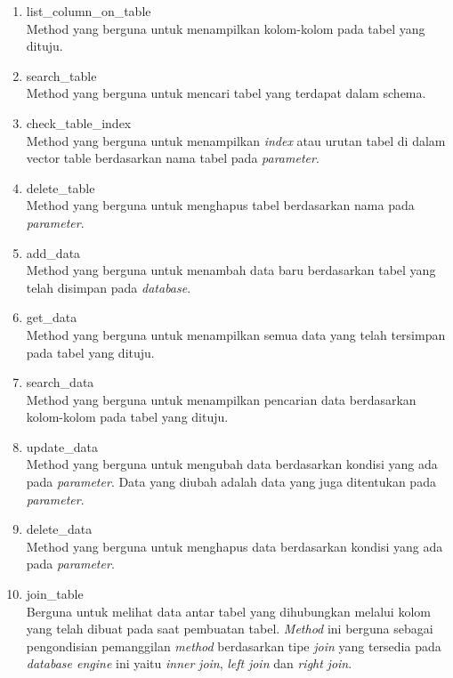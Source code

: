 \begin{enumerate}
	\item list\_column\_on\_table \\
	Method yang berguna untuk menampilkan kolom-kolom pada tabel yang dituju.
			

	\item search\_table \\
	Method yang berguna untuk mencari tabel yang terdapat dalam schema.

	\item check\_table\_index \\
	Method yang berguna untuk menampilkan \emph{index} atau urutan tabel di dalam vector table berdasarkan nama tabel pada \emph{parameter}.

	\item delete\_table \\
	Method yang berguna untuk menghapus tabel berdasarkan nama pada \emph{parameter}.
  
	\item add\_data \\
	Method yang berguna untuk menambah data baru berdasarkan tabel yang telah disimpan pada \emph{database}.
  
	\item get\_data \\
	Method yang berguna untuk menampilkan semua data yang telah tersimpan pada tabel yang dituju.

	\item search\_data \\
	Method yang berguna untuk menampilkan pencarian data berdasarkan kolom-kolom pada tabel yang dituju.

	\item update\_data \\
	Method yang berguna untuk mengubah data berdasarkan kondisi yang ada pada \emph{parameter}. Data yang diubah adalah data yang juga ditentukan 
  pada \emph{parameter}.

	\item delete\_data \\
	Method yang berguna untuk menghapus data berdasarkan kondisi yang ada pada \emph{parameter}.

	\item join\_table \\
	Berguna untuk melihat data antar tabel yang dihubungkan melalui kolom yang telah dibuat pada saat pembuatan tabel. \emph{Method} ini berguna sebagai
  pengondisian pemanggilan \emph{method} berdasarkan tipe \emph{join} yang tersedia pada \emph{database engine} ini yaitu \emph{inner} \emph{join}, \emph{left} \emph{join} dan \emph{right} \emph{join}.


\end{enumerate}
